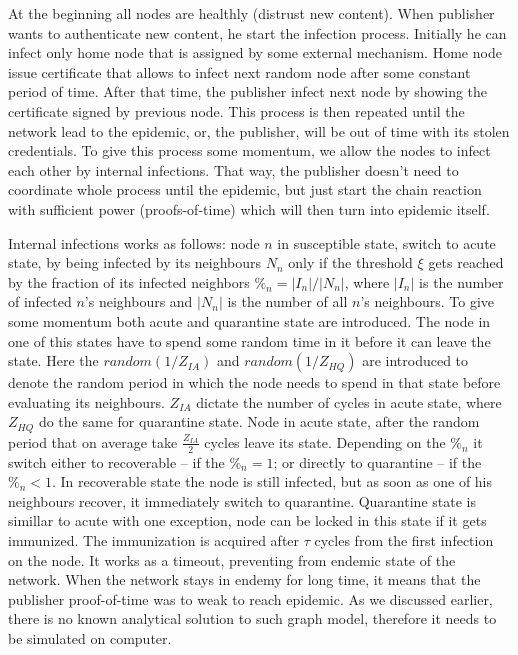 \documentclass[nostrict]{szablonPG}
\begin{document}
At the beginning all nodes are healthly (distrust new content). When publisher wants to authenticate new content, he start the infection process. Initially he can infect only home node that is assigned by some external mechanism. Home node issue certificate that allows to infect next random node after some constant period of time. After that time, the publisher infect next node by showing the certificate signed by previous node. This process is then repeated until the network lead to the epidemic, or, the publisher, will be out of time with its stolen credentials. To give this process some momentum, we allow the nodes to infect each other by internal infections. That way, the publisher doesn't need to coordinate whole process until the epidemic, but just start the chain reaction with sufficient power (proofs-of-time) which will then turn into epidemic itself.

Internal infections works as follows: node $n$ in susceptible state, switch to acute state, by being infected by its neighbours $N_n$ only if the threshold $\xi$ gets reached by the fraction of its infected neighbors $\%_n = |I_n|/|N_n|$, where $|I_n|$ is the number of infected $n$'s neighbours and $|N_n|$ is the number of all $n$'s neighbours. To give some momentum both acute and quarantine state are introduced. The node in one of this states have to spend some random time in it before it can leave the state. Here the $random(1/Z_{IA})$ and $random(1/Z_{HQ})$ are introduced to denote the random period in which the node needs to spend in that state before evaluating its neighbours. $Z_{IA}$ dictate the number of cycles in acute state, where $Z_{HQ}$ do the same for quarantine state. Node in acute state, after the random period that on average take $\frac{Z_{IA}}{2}$ cycles leave its state. Depending on the $\%_n$ it switch either to recoverable -- if the $\%_n = 1$; or directly to quarantine -- if the $\%_n < 1$. In recoverable state the node is still infected, but as soon as one of his neighbours recover, it immediately switch to quarantine. Quarantine state is simillar to acute with one exception, node can be locked in this state if it gets immunized. The immunization is acquired after $\tau$ cycles from the first infection on the node. It works as a timeout, preventing from endemic state of the network. When the network stays in endemy for long time, it means that the publisher proof-of-time was to weak to reach epidemic. As we discussed earlier, there is no known analytical solution to such graph model, therefore it needs to be simulated on computer.
\end{document}
